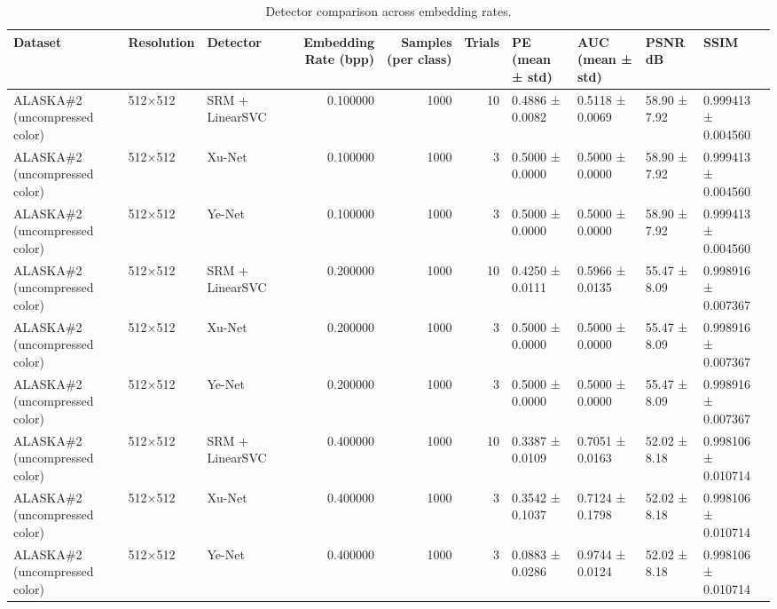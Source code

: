 \begin{table}
\caption{Detector comparison across embedding rates.}
\label{tab:detector_comparison}
\begin{tabular}{lllrrrllll}
\toprule
Dataset & Resolution & Detector & Embedding Rate (bpp) & Samples (per class) & Trials & PE (mean ± std) & AUC (mean ± std) & PSNR dB & SSIM \\
\midrule
ALASKA\#2 (uncompressed color) & 512×512 & SRM + LinearSVC & 0.100000 & 1000 & 10 & 0.4886 ± 0.0082 & 0.5118 ± 0.0069 & 58.90 ± 7.92 & 0.999413 ± 0.004560 \\
ALASKA\#2 (uncompressed color) & 512×512 & Xu-Net & 0.100000 & 1000 & 3 & 0.5000 ± 0.0000 & 0.5000 ± 0.0000 & 58.90 ± 7.92 & 0.999413 ± 0.004560 \\
ALASKA\#2 (uncompressed color) & 512×512 & Ye-Net & 0.100000 & 1000 & 3 & 0.5000 ± 0.0000 & 0.5000 ± 0.0000 & 58.90 ± 7.92 & 0.999413 ± 0.004560 \\
ALASKA\#2 (uncompressed color) & 512×512 & SRM + LinearSVC & 0.200000 & 1000 & 10 & 0.4250 ± 0.0111 & 0.5966 ± 0.0135 & 55.47 ± 8.09 & 0.998916 ± 0.007367 \\
ALASKA\#2 (uncompressed color) & 512×512 & Xu-Net & 0.200000 & 1000 & 3 & 0.5000 ± 0.0000 & 0.5000 ± 0.0000 & 55.47 ± 8.09 & 0.998916 ± 0.007367 \\
ALASKA\#2 (uncompressed color) & 512×512 & Ye-Net & 0.200000 & 1000 & 3 & 0.5000 ± 0.0000 & 0.5000 ± 0.0000 & 55.47 ± 8.09 & 0.998916 ± 0.007367 \\
ALASKA\#2 (uncompressed color) & 512×512 & SRM + LinearSVC & 0.400000 & 1000 & 10 & 0.3387 ± 0.0109 & 0.7051 ± 0.0163 & 52.02 ± 8.18 & 0.998106 ± 0.010714 \\
ALASKA\#2 (uncompressed color) & 512×512 & Xu-Net & 0.400000 & 1000 & 3 & 0.3542 ± 0.1037 & 0.7124 ± 0.1798 & 52.02 ± 8.18 & 0.998106 ± 0.010714 \\
ALASKA\#2 (uncompressed color) & 512×512 & Ye-Net & 0.400000 & 1000 & 3 & 0.0883 ± 0.0286 & 0.9744 ± 0.0124 & 52.02 ± 8.18 & 0.998106 ± 0.010714 \\
\bottomrule
\end{tabular}
\end{table}
